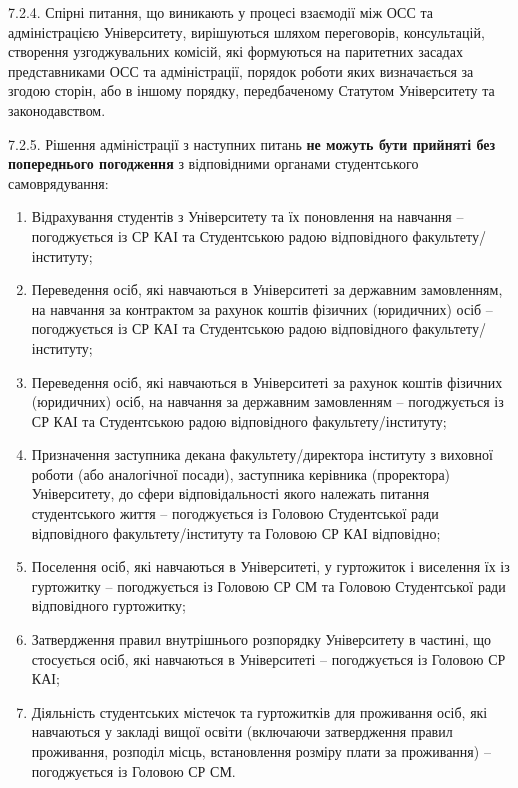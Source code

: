     7.2.4. Спірні питання, що виникають у процесі взаємодії між ОСС та адміністрацією Університету, вирішуються шляхом переговорів, консультацій, створення узгоджувальних комісій, які формуються на паритетних засадах представниками ОСС та адміністрації, порядок роботи яких визначається за згодою сторін, або в іншому порядку, передбаченому Статутом Університету та законодавством.

    7.2.5. Рішення адміністрації з наступних питань \textbf{не можуть бути прийняті без попереднього погодження} з відповідними органами студентського самоврядування:
        \begin{enumerate}[label=\arabic*)]
            \item Відрахування студентів з Університету та їх поновлення на навчання -- погоджується із СР КАІ та Студентською радою відповідного факультету/інституту;
            \item Переведення осіб, які навчаються в Університеті за державним замовленням, на навчання за контрактом за рахунок коштів фізичних (юридичних) осіб -- погоджується із СР КАІ та Студентською радою відповідного факультету/інституту;
            \item Переведення осіб, які навчаються в Університеті за рахунок коштів фізичних (юридичних) осіб, на навчання за державним замовленням -- погоджується із СР КАІ та Студентською радою відповідного факультету/інституту;
            \item Призначення заступника декана факультету/директора інституту з виховної роботи (або аналогічної посади), заступника керівника (проректора) Університету, до сфери відповідальності якого належать питання студентського життя -- погоджується із Головою Студентської ради відповідного факультету/інституту та Головою СР КАІ відповідно;
            \item Поселення осіб, які навчаються в Університеті, у гуртожиток і виселення їх із гуртожитку -- погоджується із Головою СР СМ та Головою Студентської ради відповідного гуртожитку;
            \item Затвердження правил внутрішнього розпорядку Університету в частині, що стосується осіб, які навчаються в Університеті -- погоджується із Головою СР КАІ;
            \item Діяльність студентських містечок та гуртожитків для проживання осіб, які навчаються у закладі вищої освіти (включаючи затвердження правил проживання, розподіл місць, встановлення розміру плати за проживання) -- погоджується із Головою СР СМ.
        \end{enumerate}

